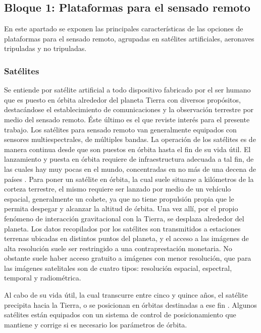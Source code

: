 \subsection{Bloque 1: Plataformas para el sensado remoto}
En este apartado se exponen las principales características de las opciones de plataformas para el sensado remoto, agrupadas en satélites artificiales, aeronaves tripuladas y no tripuladas.
\subsubsection{Satélites}

Se entiende por satélite artificial a todo dispositivo fabricado por el ser humano que es puesto en órbita alrededor del planeta Tierra con diversos propósitos, destacándose el establecimiento de comunicaciones y la observación terrestre por medio del sensado remoto. Éste último es el que reviste interés para el presente trabajo. Los satélites para sensado remoto van generalmente equipados con sensores multiespectrales, de múltiples bandas. La operación de los satélites es de manera continua desde que son puestos en órbita hasta el fin de su vida útil. El lanzamiento y puesta en órbita requiere de infraestructura adecuada a tal fin, de las cuales hay muy pocas en el mundo, concentradas en no más de una decena de países \cite{noauthor_que_nodate}. Para poner un satélite en órbita, la cual suele situarse a kilómetros de la corteza terrestre, el mismo requiere ser lanzado por medio de un vehículo espacial, generalmente un cohete, ya que no tiene propulsión propia que le permita despegar y alcanzar la altitud de órbita. Una vez allí, por el propio fenómeno de interacción gravitacional con la Tierra, se desplaza alrededor del planeta.
Los datos recopilados por los satélites son transmitidos a estaciones terrenas ubicadas en distintos puntos del planeta, y el acceso a las imágenes de alta resolución suele ser restringido a una contraprestación monetaria. No obstante suele haber acceso gratuito a imágenes con menor resolución, que para las imágenes satelitales son de cuatro tipos: resolución espacial, espectral, temporal y radiométrica.

Al cabo de su vida útil, la cual transcurre entre cinco y quince años, el satélite precipita hacia la Tierra, o se posicionan en órbitas destinadas a ese fin \cite{noauthor_keeping_nodate}. Algunos satélites están equipados con un sistema de control de posicionamiento que mantiene y corrige si es necesario los parámetros de órbita.


